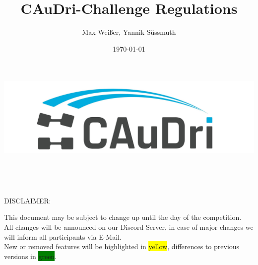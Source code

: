 \documentclass[a4paper]{report}
\title{CAuDri-Challenge Regulations \the\year{}}
\author{Max Weißer, Yannik Süssmuth}
\date{\today}
\begin{document}
\begin{titlepage}
	\makeatletter
	\begin{center}
		\vspace*{3cm}

		\includegraphics[width=\textwidth]{graphics/caudri_logo_no_border.jpg}\\
		\vspace{1cm}

		\Huge\bfseries\@title\\
		\vspace{\baselineskip}

		\Large\@date\\
		\vspace{8cm}

		\large DISCLAIMER:\\

		{\raggedright This document may be subject to change up until the day of the competition.\\
		All changes will be announced on our Discord Server, in case of major changes we will inform all participants via E-Mail.\\
		New or removed features will be highlighted in \colorbox{yellow}{yellow}, differences to previous versions in \colorbox{green}{green}.\\}

	\end{center}
	\makeatother
\end{titlepage}

\tableofcontents









\end{document}
